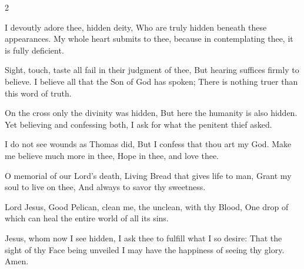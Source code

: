 \begin{multicols}{2}
\raggedcolumns
\begin{enpars}
I devoutly adore thee, hidden deity,
Who are truly hidden beneath these appearances.
My whole heart submits to thee,
because in contemplating thee, it is fully deficient.

Sight, touch, taste all fail in their judgment of thee,
But hearing suffices firmly to believe.
I believe all that the Son of God has spoken;
There is nothing truer than this word of truth.

On the cross only the divinity was hidden,
But here the humanity is also hidden.
Yet believing and confessing both,
I ask for what the penitent thief asked.

I do not see wounds as Thomas did,
But I confess that thou art my God.
Make me believe much more in thee,
Hope in thee, and love thee.

O memorial of our Lord's death,
Living Bread that gives life to man,
Grant my soul to live on thee,
And always to savor thy sweetness.

Lord Jesus, Good Pelican,
clean me, the unclean, with thy Blood,
One drop of which can heal
the entire world of all its sins.

Jesus, whom now I see hidden,
I ask thee to fulfill what I so desire:
That the sight of thy Face being unveiled
I may have the happiness of seeing thy glory. Amen.
\end{enpars}
\end{multicols}